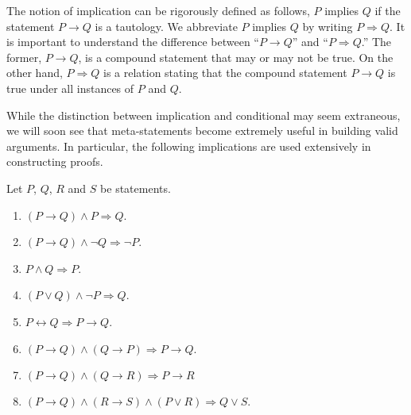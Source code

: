 The notion of implication can be rigorously defined as follows, $P$ implies $Q$ if the statement $P \rightarrow Q$ is a tautology.
We abbreviate $P$ implies $Q$ by writing $P \Rightarrow Q$.
It is important to understand the difference between ``$P \rightarrow Q$'' and ``$P \Rightarrow Q$.''
The former, $P \rightarrow Q$, is a compound statement that may or may not be true.
On the other hand, $P \Rightarrow Q$ is a relation stating that the compound statement $P \rightarrow Q$ is true under all instances of $P$ and $Q$.

While the distinction between implication and conditional may seem extraneous, we will soon see that meta-statements become extremely useful in building valid arguments.
In particular, the following implications are used extensively in constructing proofs.
\begin{fact}
Let $P$, $Q$, $R$ and $S$ be statements.
\begin{enumerate}
\item $(P \rightarrow Q) \wedge P \Rightarrow Q$.
\item $(P \rightarrow Q) \wedge \neg Q \Rightarrow \neg P$.
\item $P \wedge Q \Rightarrow P$.
\item $(P \vee Q) \wedge \neg P \Rightarrow Q$.
\item $P \leftrightarrow Q \Rightarrow P \rightarrow Q$.
\item $(P \rightarrow Q) \wedge (Q \rightarrow P) \Rightarrow P \rightarrow Q$.
\item $(P \rightarrow Q) \wedge (Q \rightarrow R) \Rightarrow P \rightarrow R$
\item $(P \rightarrow Q) \wedge (R \rightarrow S) \wedge (P \vee R) \Rightarrow Q \vee S$.
\end{enumerate}
\end{fact}

